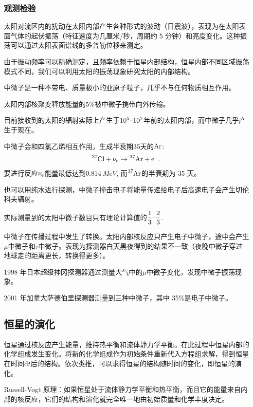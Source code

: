 \documentclass[../天体物理基础.tex]{subfiles}
\begin{document}
\subsubsection{观测检验}
太阳对流区内的扰动在太阳内部产生各种形式的波动（日震波），表现为在太阳表面气体的起伏振荡（特征速度为几厘米/秒，周期约 5 分钟）和亮度变化。这种振荡可以通过太阳表面谱线的多普勒位移来测定。

由于振动频率可以精确测定，且频率依赖于恒星内部结构，恒星内部不同区域振荡模式不同，我们可以利用太阳的振荡现象研究太阳的内部结构。

中微子是一种不带电、质量极小的亚原子粒子，几乎不与任何物质相互作用。

太阳内部核聚变释放能量的$5\%$被中微子携带向外传输。

目前接收到的太阳的辐射实际上产生于$10^{5}\text{\textendash}10^{7}$年前的太阳内部，而中微子几乎产生于现在。

中微子会和四氯乙烯相互作用，生成半衰期$35$天的$\ce{Ar}$:
\begin{equation}
\ce{^{37}Cl}+\nu_{\ce{e}}\to\ce{^{37}Ar}+\ce{e-}.\\
\end{equation}
要进行反应$\nu_{\ce{e}}$能量最低达到$\qty{0.814}{MeV}$, 而$\ce{^{37}Ar}$的半衰期为 35 天。

也可以用纯水进行探测，中微子撞击电子将能量传递给电子后高速电子会产生切伦科夫辐射。

实际测量到的太阳中微子数目只有理论计算值的$\dfrac{1}{3}\text{\textendash}\dfrac{2}{3}$.

中微子在传播过程中发生了转换。太阳内部核反应只产生电子中微子，途中会产生$\mu$中微子和$\tau$中微子。表现为探测器白天黑夜得到的结果不一致（夜晚中微子穿过地球走的距离更长，转换得更多）。

1998 年日本超级神冈探测器通过测量大气中的$\mu$中微子变化，发现中微子振荡现象。

2001 年加拿大萨德伯里探测器测量到三种中微子，其中 35\%是电子中微子。

\subsection{恒星的演化}
恒星通过核反应产生能量，维持热平衡和流体静力学平衡。在此过程中恒星内部的化学组成发生变化。将新的化学组成作为初始条件重新代入方程组求解，得到恒星在时间$\mathrm{d}t$后的结构。依次类推，可以求得恒星的结构随时间的变化，即恒星的演化。

Russell-Vogt 原理：如果恒星处于流体静力学平衡和热平衡，而且它的能量来自内部的核反应，它们的结构和演化就完全唯一地由初始质量和化学丰度决定。
\end{document}
